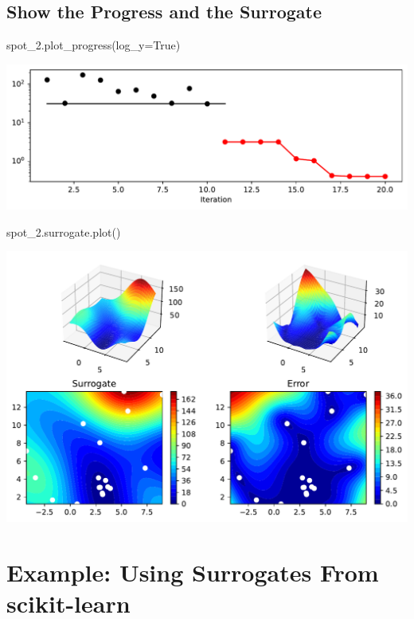 \documentclass[
  letterpaper,
  DIV=11,
  numbers=noendperiod]{scrreprt}
\newenvironment{Shaded}{\begin{snugshade}}{\end{snugshade}}
\newcommand{\NormalTok}[1]{\textcolor[rgb]{0.00,0.23,0.31}{#1}}
\newcommand{\OperatorTok}[1]{\textcolor[rgb]{0.37,0.37,0.37}{#1}}
\newcommand{\VariableTok}[1]{\textcolor[rgb]{0.07,0.07,0.07}{#1}}
\begin{document}
\subsection{Show the Progress and the
Surrogate}\label{show-the-progress-and-the-surrogate}

\begin{Shaded}
\begin{Highlighting}[]
\NormalTok{spot\_2.plot\_progress(log\_y}\OperatorTok{=}\VariableTok{True}\NormalTok{)}
\end{Highlighting}
\end{Shaded}

\includegraphics{010_num_spot_sklearn_surrogate_files/figure-pdf/cell-8-output-1.pdf}

\begin{Shaded}
\begin{Highlighting}[]
\NormalTok{spot\_2.surrogate.plot()}
\end{Highlighting}
\end{Shaded}

\includegraphics{010_num_spot_sklearn_surrogate_files/figure-pdf/cell-9-output-1.pdf}

\section{Example: Using Surrogates From
scikit-learn}\label{example-using-surrogates-from-scikit-learn}
\end{document}
